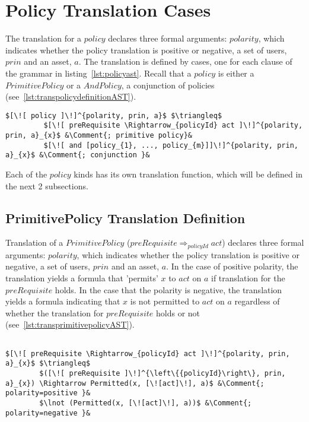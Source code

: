 \section{Policy Translation Cases}
The translation for a $policy$ declares three formal arguments: $polarity$, which indicates whether the policy translation is positive or negative, a set of users, $prin$ and an asset, $a$.
The translation is defined by cases, one for each clause of the grammar in listing~\ref{lst:policyast}. Recall that a $policy$ is either a $PrimitivePolicy$ or a $AndPolicy$, a conjunction of policies (see~\ref{lst:transpolicydefinitionAST}).


\lstset{mathescape, language=AST}  
\begin{lstlisting}[frame=single, caption={Policy Translation Cases},label={lst:transpolicydefinitionAST}]
$[\![ policy ]\!]^{polarity, prin, a}$ $\triangleq$ 
         $[\![ preRequisite \Rightarrow_{policyId} act ]\!]^{polarity, prin, a}_{x}$ &\Comment{; primitive policy}&
         $[\![ and [policy_{1}, ..., policy_{m}]]\!]^{polarity, prin, a}_{x}$ &\Comment{; conjunction }&

\end{lstlisting}

Each of the $policy$ kinds has its own translation function, which will be defined in the next 2 subsections. 

\subsection{PrimitivePolicy Translation Definition}
Translation of a $PrimitivePolicy$ ($preRequisite \Rightarrow_{policyId} act$) declares three formal arguments: $polarity$, which indicates whether the policy translation is positive or negative, a set of users, $prin$ and an asset, $a$. In the case of positive polarity, the translation yields a formula that 'permits' $x$ to $act$ on $a$ if translation for the $preRequisite$ holds. In the case that the polarity is negative, the translation yields a formula indicating that $x$ is not permitted to $act$ on $a$ regardless of whether the translation for $preRequisite$ holds or not (see~\ref{lst:transprimitivepolicyAST}).

\lstset{mathescape, language=AST} 
\begin{lstlisting}[frame=single, caption={PrimitivePolicy Translation Definition},label={lst:transprimitivepolicyAST}]

$[\![ preRequisite \Rightarrow_{policyId} act ]\!]^{polarity, prin, a}_{x}$ $\triangleq$ 
        $([\![ preRequisite ]\!]^{\left\{{policyId}\right\}, prin, a}_{x}) \Rightarrow Permitted(x, [\![act]\!], a)$ &\Comment{; polarity=positive }&
        $\lnot (Permitted(x, [\![act]\!], a))$ &\Comment{; polarity=negative }&

\end{lstlisting}


